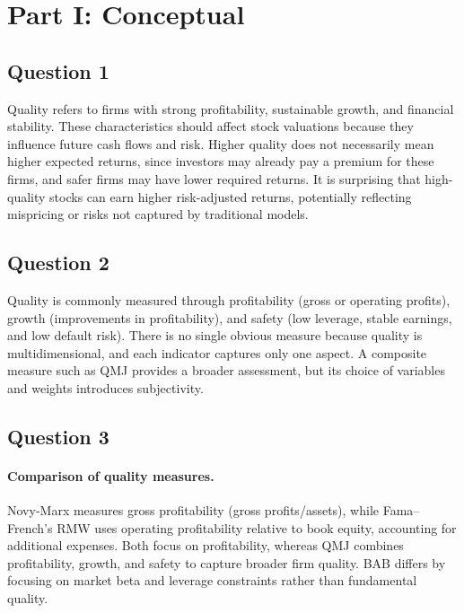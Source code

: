 
\section{Part I: Conceptual}

\subsection*{Question 1}
Quality refers to firms with strong profitability, sustainable growth, and financial stability. These characteristics should affect stock valuations because they influence future cash flows and risk. Higher quality does not necessarily mean higher expected returns, since investors may already pay a premium for these firms, and safer firms may have lower required returns. It is surprising that high-quality stocks can earn higher risk-adjusted returns, potentially reflecting mispricing or risks not captured by traditional models.

\subsection*{Question 2}
Quality is commonly measured through profitability (gross or operating profits), growth (improvements in profitability), and safety (low leverage, stable earnings, and low default risk). There is no single obvious measure because quality is multidimensional, and each indicator captures only one aspect. A composite measure such as QMJ provides a broader assessment, but its choice of variables and weights introduces subjectivity.

\subsection*{Question 3}

\paragraph{Comparison of quality measures.}
Novy-Marx measures gross profitability (gross profits/assets), while Fama--French's RMW uses operating profitability relative to book equity, accounting for additional expenses. Both focus on profitability, whereas QMJ combines profitability, growth, and safety to capture broader firm quality. BAB differs by focusing on market beta and leverage constraints rather than fundamental quality.

